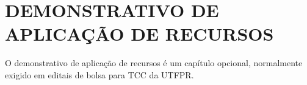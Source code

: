 
\chapter{DEMONSTRATIVO DE APLICAÇÃO DE RECURSOS}
\label{chap:demonstrativo}

O demonstrativo de aplicação de recursos é um capítulo opcional, normalmente exigido em editais de bolsa para TCC da UTFPR.


